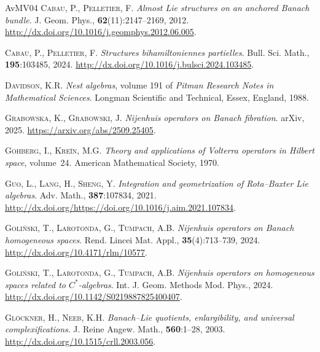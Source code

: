 \documentclass[a4paper,12pt,reqno]{amsart}%
\theoremstyle{definition}
\theoremstyle{remark}
\numberwithin{theorem}{section}
\numberwithin{equation}{section}
\newcommand{\1}{{\bf 1}}
\begin{document}
\begin{thebibliography}{AvMV04}
\textsc{Cabau, P.}, \textsc{Pelletier, F.}
\newblock \emph{Almost {L}ie structures on an anchored {B}anach bundle}.
\newblock J. Geom. Phys., \textbf{62}(11):2147--2169, 2012.
\newblock \urlprefix\url{http://dx.doi.org/10.1016/j.geomphys.2012.06.005}.

\textsc{Cabau, P.}, \textsc{Pelletier, F.}
\newblock \emph{Structures bihamiltoniennes partielles}.
\newblock Bull. Sci. Math., \textbf{195}:103485, 2024.
\newblock \urlprefix\url{http://dx.doi.org/10.1016/j.bulsci.2024.103485}.

\textsc{Davidson, K.R.}
\newblock \emph{Nest algebras}, volume 191 of \emph{Pitman Research Notes in
  Mathematical Sciences}.
\newblock Longman Scientific and Technical, Essex, England, 1988.

\textsc{Grabowska, K.}, \textsc{Grabowski, J.}
\newblock \emph{{N}ijenhuis operators on {B}anach fibration}.
\newblock arXiv, 2025.
\newblock \urlprefix\url{https://arxiv.org/abs/2509.25405}.

\textsc{Gohberg, I.}, \textsc{Kre\u{\i}n, M.G.}
\newblock \emph{Theory and applications of {V}olterra operators in {H}ilbert
  space}, volume~24.
\newblock American Mathematical Society, 1970.

\textsc{Guo, L.}, \textsc{Lang, H.}, \textsc{Sheng, Y.}
\newblock \emph{Integration and geometrization of {R}ota--{B}axter {L}ie
  algebras}.
\newblock Adv. Math., \textbf{387}:107834, 2021.
\newblock
  \urlprefix\url{http://dx.doi.org/https://doi.org/10.1016/j.aim.2021.107834}.

\textsc{Goliński, T.}, \textsc{Larotonda, G.}, \textsc{Tumpach, A.B.}
\newblock \emph{{N}ijenhuis operators on {B}anach homogeneous spaces}.
\newblock Rend. Lincei Mat. Appl., \textbf{35}(4):713–739, 2024.
\newblock \urlprefix\url{http://dx.doi.org/10.4171/rlm/10577}.

\textsc{Goliński, T.}, \textsc{Larotonda, G.}, \textsc{Tumpach, A.B.}
\newblock \emph{{N}ijenhuis operators on homogeneous spaces related to
  ${C}^*$-algebras}.
\newblock Int. J. Geom. Methods Mod. Phys., 2024.
\newblock \urlprefix\url{http://dx.doi.org/10.1142/S0219887825400407}.

\textsc{Gl{\"o}ckner, H.}, \textsc{Neeb, K.H.}
\newblock \emph{{B}anach--{L}ie quotients, enlargibility, and universal
  complexifications}.
\newblock J. Reine Angew. Math., \textbf{560}:1--28, 2003.
\newblock \urlprefix\url{http://dx.doi.org/10.1515/crll.2003.056}.


\end{thebibliography}
\end{document}
